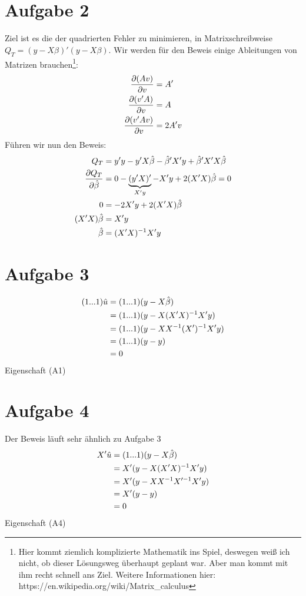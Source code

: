 \documentclass{article}
\begin{document}
	\section*{Aufgabe 2}
	Ziel ist es die der quadrierten Fehler zu minimieren, in Matrixschreibweise $Q_T=(y-X\beta)'(y-X\beta)$. Wir werden für den Beweis einige Ableitungen von Matrizen brauchen\footnote{Hier kommt ziemlich komplizierte Mathematik ins Spiel, deswegen weiß ich nicht, ob dieser Lösungsweg überhaupt geplant war. Aber man kommt mit ihm recht schnell ans Ziel. Weitere Informationen hier: https://en.wikipedia.org/wiki/Matrix\_calculus}:
	\begin{align}
		\frac{\partial (Av)}{\partial v} &= A' \notag \\
		\frac{\partial (v'A)}{\partial v} &= A \notag \\
		\frac{\partial (v'Av)}{\partial v} &= 2A'v \notag
	\end{align}
	Führen wir nun den Beweis:
	\begin{align}
		Q_T &= y'y - y'X\hat{\beta} - \hat{\beta}'X'y + \hat{\beta}'X'X\hat{\beta} \notag \\
		\frac{\partial Q_T}{\partial \hat{\beta}} &= 0 - \underbrace{(y'X)'}_{X'y} - X'y + 2(X'X)\hat{\beta} = 0 \notag \\
		0 &= -2X'y + 2(X'X)\hat{\beta} \notag \\
		(X'X)\hat{\beta} &= X'y \notag \\
		\hat{\beta} &= (X'X)^{-1}X'y \notag
	\end{align}
	
	\section*{Aufgabe 3}
	\begin{align}
		(1 ... 1)\hat{u} &= (1 ... 1)(y-X\hat{\beta}) \notag \\
		&= (1...1)(y-X(X'X)^{-1}X'y) \notag \\
		&= (1...1)(y-XX^{-1}(X')^{-1}X'y) \notag \\
		&= (1...1)(y-y) \notag \\
		&= 0 \notag
	\end{align}
	Eigenschaft (A1)

	\section*{Aufgabe 4}
	Der Beweis läuft sehr ähnlich zu Aufgabe 3
	\begin{align}
		X'\hat{u} &= (1 ... 1)(y-X\hat{\beta}) \notag \\
		&= X'(y-X(X'X)^{-1}X'y) \notag \\
		&= X'(y-XX^{-1}X'^{-1}X'y) \notag \\
		&= X'(y-y) \notag \\
		&= 0 \notag
	\end{align}
	Eigenschaft (A4)
\end{document}
